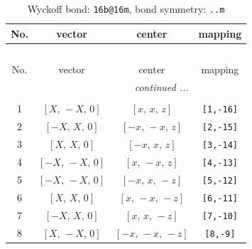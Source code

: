 \documentclass[fleqn,8pt]{jsarticle}
\begin{document}
\begin{longtable}{cccc}
\caption{Wyckoff bond: {\tt 16b@16m}, bond symmetry: {\tt ..m}}
 \\
 \hline \hline
No. & vector & center & mapping \\ \hline \endfirsthead

\multicolumn{3}{l}{\tablename\ \thetable{}} \\
 \hline \hline
No. & vector & center & mapping \\ \hline \endhead

 \hline \hline
\multicolumn{3}{r}{\footnotesize\it continued ...} \\ \endfoot

 \hline \hline
\multicolumn{3}{r}{} \\ \endlastfoot

1 & $\left[ X,\, - X,\, 0 \right]$ & $\left[ x,\, x,\, z \right]$ & {\tt [1,-16]} \\ \hline
2 & $\left[ - X,\, X,\, 0 \right]$ & $\left[ - x,\, - x,\, z \right]$ & {\tt [2,-15]} \\ \hline
3 & $\left[ X,\, X,\, 0 \right]$ & $\left[ - x,\, x,\, z \right]$ & {\tt [3,-14]} \\ \hline
4 & $\left[ - X,\, - X,\, 0 \right]$ & $\left[ x,\, - x,\, z \right]$ & {\tt [4,-13]} \\ \hline
5 & $\left[ - X,\, - X,\, 0 \right]$ & $\left[ - x,\, x,\, - z \right]$ & {\tt [5,-12]} \\ \hline
6 & $\left[ X,\, X,\, 0 \right]$ & $\left[ x,\, - x,\, - z \right]$ & {\tt [6,-11]} \\ \hline
7 & $\left[ - X,\, X,\, 0 \right]$ & $\left[ x,\, x,\, - z \right]$ & {\tt [7,-10]} \\ \hline
8 & $\left[ X,\, - X,\, 0 \right]$ & $\left[ - x,\, - x,\, - z \right]$ & {\tt [8,-9]} \\
\end{longtable}
\renewcommand{\arraystretch}{1.2}
\end{document}
